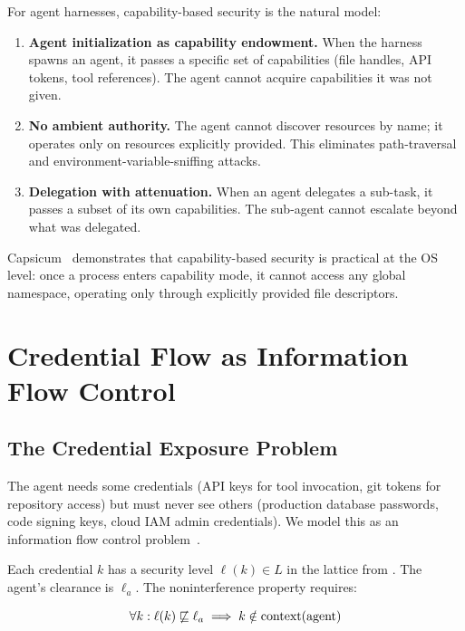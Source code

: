 \documentclass[11pt, a4paper, copyright]{googledeepmind}
\begin{document}
For agent harnesses, capability-based security is the natural model:

\begin{enumerate}
    \item \textbf{Agent initialization as capability endowment.} When the harness spawns an agent, it passes a specific set of capabilities (file handles, API tokens, tool references). The agent cannot acquire capabilities it was not given.
    \item \textbf{No ambient authority.} The agent cannot discover resources by name; it operates only on resources explicitly provided. This eliminates path-traversal and environment-variable-sniffing attacks.
    \item \textbf{Delegation with attenuation.} When an agent delegates a sub-task, it passes a subset of its own capabilities. The sub-agent cannot escalate beyond what was delegated.
\end{enumerate}

Capsicum~\citep{watson2010capsicum} demonstrates that capability-based security is practical at the OS level: once a process enters capability mode, it cannot access any global namespace, operating only through explicitly provided file descriptors.


\section{Credential Flow as Information Flow Control}
\label{sec:credential}

\subsection{The Credential Exposure Problem}

The agent needs some credentials (API keys for tool invocation, git tokens for repository access) but must never see others (production database passwords, code signing keys, cloud IAM admin credentials). We model this as an information flow control problem~\citep{denning1976lattice}.

Each credential $k$ has a security level $\ell(k) \in L$ in the lattice from . The agent's clearance is $\ell_a$. The noninterference property requires:

\begin{equation}
\label{eq:noninterference}
\forall k: \ell(k) \not\sqsubseteq \ell_a \implies k \notin \textup{context}(\textup{agent})
\end{equation}
\end{document}
